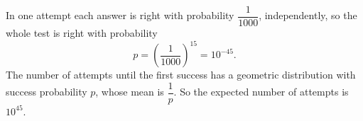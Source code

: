 In one attempt each answer is right with probability $\dfrac{1}{1000}$, independently, so the whole test is right with probability
\[
p=\left(\dfrac{1}{1000}\right)^{15}=10^{-45}.
\]
The number of attempts until the first success has a geometric distribution with success probability $p$, whose mean is $\dfrac{1}{p}$. So the expected number of attempts is $\boxed{10^{45}}$.
